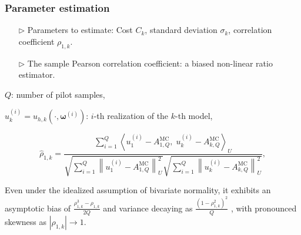 \documentclass{beamer}
\begin{document}
\begin{frame}[t]
    \frametitle{Parameter estimation}
    \begin{itemize}[leftmargin=5pt] 
    \item[$\triangleright$] Parameters to estimate: Cost $C_k$, standard deviation $\sigma_k$, correlation coefficient $\rho_{1,k}$.
    \item[$\triangleright$] The sample Pearson correlation coefficient: a biased non-linear ratio estimator.
    \end{itemize}
    $Q$: number of pilot samples,
    
    $u_k^{(i)} = u_{h,k}(\cdot, \boldsymbol{\omega}^{(i)})$: $i$-th realization of the $k$-th model,

    
%
\[
\widehat{\rho}_{1,k} = \frac{\sum_{i=1}^Q\left\langle u_{1}^{(i)} - A_{1,Q}^{\text{MC}},\; u_{k}^{(i)} - A_{k,Q}^{\text{MC}} \right\rangle_U}{\sqrt{\sum_{i=1}^Q \left\|u_{1}^{(i)} - A_{1,Q}^{\text{MC}}\right\|_U^2} \sqrt{\sum_{i=1}^Q \left\|u_{k}^{(i)} - A_{k,Q}^{\text{MC}}\right\|_U^2}},
\]
%

Even under the idealized assumption of bivariate normality, it exhibits an asymptotic bias of $\frac{\rho_{1,k}^3 - \rho_{1,k}}{2Q}$ and variance decaying as $\frac{(1 - \rho_{1,k}^2)^2}{Q}$ \cite{Fi:1915, Ha:2007, Ri:1932}, with pronounced skewness as $|\rho_{1,k}| \to 1$.

\end{frame}
\end{document}
